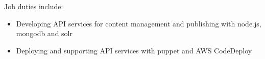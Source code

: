 \normalsize
Job duties include:
\small
\begin{itemize}
    \item Developing API services for content management and publishing with node.js, mongodb and solr
    \item Deploying and supporting API services with puppet and AWS CodeDeploy
\end{itemize}
\normalsize
\medskip
